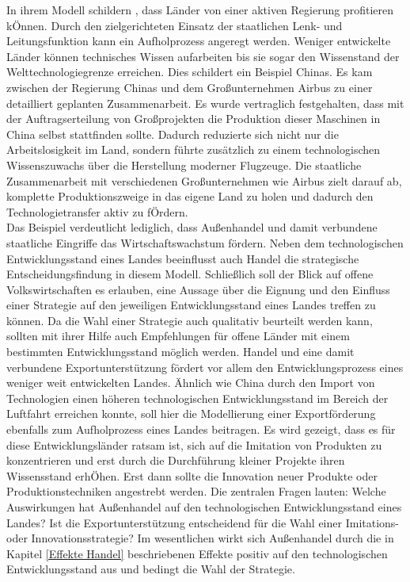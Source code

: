 %
In ihrem Modell schildern \cite{Acemoglu.2006}, dass Länder von einer aktiven Regierung profitieren kÖnnen. Durch den zielgerichteten Einsatz der staatlichen Lenk- und Leitungsfunktion kann ein Aufholprozess angeregt werden. Weniger entwickelte Länder können technisches Wissen aufarbeiten bis sie sogar den Wissenstand der Welttechnologiegrenze erreichen. Dies schildert ein Beispiel Chinas. Es kam zwischen der Regierung Chinas und dem Großunternehmen Airbus zu einer detailliert geplanten Zusammenarbeit. Es wurde vertraglich festgehalten, dass mit der Auftragserteilung von Großprojekten die Produktion dieser Maschinen in China selbst stattfinden sollte. Dadurch reduzierte sich nicht nur die Arbeitslosigkeit im Land, sondern führte zusätzlich zu einem technologischen Wissenszuwachs über die Herstellung moderner Flugzeuge. Die staatliche Zusammenarbeit mit verschiedenen Großunternehmen wie Airbus zielt darauf ab, komplette Produktionszweige in das eigene Land zu holen und dadurch den Technologietransfer aktiv zu fÖrdern.\\
%
Das Beispiel verdeutlicht lediglich, dass Außenhandel und damit verbundene staatliche Eingriffe  das Wirtschaftswachstum fördern. Neben dem technologischen Entwicklungsstand eines Landes beeinflusst auch Handel die strategische Entscheidungsfindung in diesem Modell. Schließlich soll der Blick auf offene Volkswirtschaften es erlauben, eine Aussage über die Eignung und den Einfluss einer Strategie auf den jeweiligen Entwicklungsstand eines Landes treffen zu können. Da die Wahl einer Strategie auch qualitativ  beurteilt werden kann, sollten mit ihrer Hilfe auch Empfehlungen für offene Länder mit einem bestimmten Entwicklungsstand möglich werden. 
%
Handel und eine damit verbundene Exportunterstützung fördert vor allem den Entwicklungsprozess eines weniger weit entwickelten Landes. Ähnlich wie China durch den Import von Technologien einen höheren technologischen Entwicklungsstand im Bereich der Luftfahrt erreichen konnte, soll hier die Modellierung einer Exportförderung ebenfalls zum Aufholprozess eines Landes beitragen. Es wird gezeigt, dass es für diese Entwicklungsländer ratsam ist, sich auf die Imitation von Produkten zu konzentrieren und erst durch die Durchführung kleiner Projekte ihren Wissensstand erhÖhen. Erst dann sollte die Innovation neuer Produkte oder Produktionstechniken angestrebt werden. Die zentralen Fragen lauten: Welche Auswirkungen hat Außenhandel auf den technologischen Entwicklungsstand eines Landes? Ist die Exportunterstützung entscheidend für die Wahl einer Imitations- oder Innovationsstrategie? Im wesentlichen wirkt sich Außenhandel durch die in Kapitel \ref{Effekte Handel} beschriebenen Effekte positiv auf den technologischen Entwicklungsstand aus und bedingt die Wahl der Strategie.
